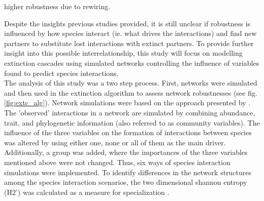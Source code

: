 \documentclass[12pt,a4paper]{article}
\begin{document}
\parencite{Kaiser-Bunbury2010, Schleuning2016, Timoteo2016, Costa2018} higher robustness due to rewiring. %



Despite the insights previous studies provided, it is still unclear if robustness is influenced by how species interact (ie. what drives the interactions) and find new partners to substitute lost interactions with extinct partners. To provide further insight into this possible interrelationship, this study will focus on modelling extinction cascades using simulated networks controlling the influence of variables found to predict species interactions.\\


The analysis of this study was a two step process. First, networks were simulated and then used in the extinction algorithm to assess network robustnesses (see fig. \ref{fig:extc_alg}).  
Network simulations were based on the approach presented by \citeauthor{Benadi2022} \parencite{Benadi2022}. The 'observed' interactions in a network are simulated by combining abundance, trait, and phylogenetic information (also referred to as community variables). The influence of the three variables on the formation of interactions between species was altered by using either one, none or all of them as the main driver. Additionally, a group was added, where the importances of the three variables mentioned above were not changed. Thus, six ways of species interaction simulations were implemented.
To identify differences in the network structures among the species interaction scenarios, the two dimensional shannon entropy (H2') was calculated as a measure for specialization \parencite{Bluethgen2006}.



	
\end{document}
